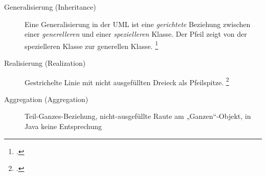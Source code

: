 \documentclass{bschlangaul-theorie}
\begin{document}
\begin{description}
\begin{center}
\end{center}

%

\item[Generalisierung (Inheritance)]

Eine Generalisierung in der UML ist
eine \emph{gerichtete} Beziehung zwischen einer \emph{generelleren} und
einer \emph{spezielleren} Klasse. Der Pfeil zeigt von der spezielleren
Klasse zur generellen Klasse.
\footcite[Kapitel 6.4.6 Generalisierung, Seite 135]{rupp}

\begin{center}
\end{center}

\item[Realisierung (Realization)] Gestrichelte Linie mit nicht
ausgefüllten Dreieck als Pfeilspitze. 
\footcite[Kapitel 6.4.13, Seite 164]{rupp}

\begin{center}
\end{center}

%

\item[Aggregation (Aggregation)]

Teil-Ganzes-Beziehung, nicht-ausgefüllte Raute am „Ganzen“-Objekt,
in Java keine Entsprechung

\begin{center}
\end{center}


\end{description}
\end{document}
